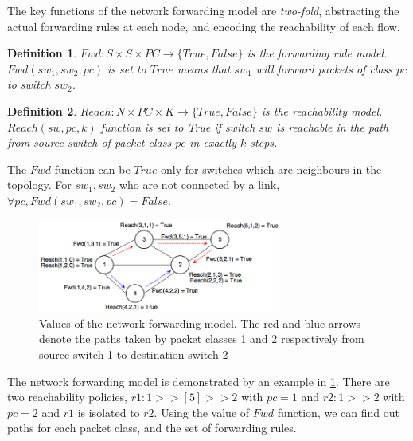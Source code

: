 \documentclass[]{sig}
\newtheorem{mydef}{Definition}
\begin{document}
The key functions of the network forwarding model are \emph{two-fold}, abstracting the actual forwarding rules at each node, and encoding the reachability of each flow. 
\begin{mydef}
	$Fwd : S \times S \times PC  \rightarrow \{True,False\}$ is the forwarding rule model. $Fwd(sw_1, sw_2, pc)$ is set to $True$ means that $sw_1$ will forward packets of class $pc$ to switch $sw_2$.
\end{mydef}
\begin{mydef}
	$Reach : N \times PC \times K  \rightarrow \{True,False\}$ is the reachability model. $Reach(sw, pc, k)$ function is set to True if switch $sw$ is reachable in the path from source switch of packet class $pc$ in exactly $k$ steps.  
\end{mydef}
The $Fwd$ function can be $True$ only for switches which are neighbours in the topology. For $sw_1, sw_2$ who are not connected by a link, $\forall pc, Fwd(sw_1,sw_2,pc) = False$.
\begin{figure}[H]
	\includegraphics[width=8cm]{topoF.png}
	\caption{Values of the network forwarding model. The red and blue arrows denote the paths taken by packet classes 1 and 2 respectively from source switch 1 to destination switch 2}
	\label{fig:model}
\end{figure}
The network forwarding model is demonstrated by an example in \cref{fig:model}. There are two reachability policies, $r1 : 1 >> [5] >> 2$ with $pc=1$ and $r2 : 1 >> 2$ with $pc=2$ and $r1$ is isolated to $r2$. Using the value of $Fwd$ function, we can find out paths for each packet class, and the set of forwarding rules. 
\end{document}
